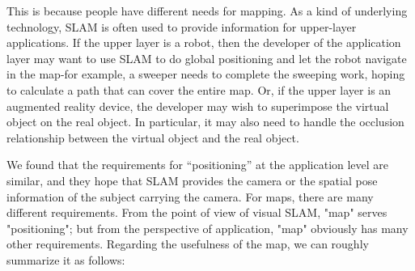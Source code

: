 This is because people have different needs for mapping. As a kind of underlying technology, SLAM is often used to provide information for upper-layer applications. If the upper layer is a robot, then the developer of the application layer may want to use SLAM to do global positioning and let the robot navigate in the map-for example, a sweeper needs to complete the sweeping work, hoping to calculate a path that can cover the entire map. Or, if the upper layer is an augmented reality device, the developer may wish to superimpose the virtual object on the real object. In particular, it may also need to handle the occlusion relationship between the virtual object and the real object.

We found that the requirements for “positioning” at the application level are similar, and they hope that SLAM provides the camera or the spatial pose information of the subject carrying the camera. For maps, there are many different requirements. From the point of view of visual SLAM, "map" serves "positioning"; but from the perspective of application, "map" obviously has many other requirements. Regarding the usefulness of the map, we can roughly summarize it as follows:

